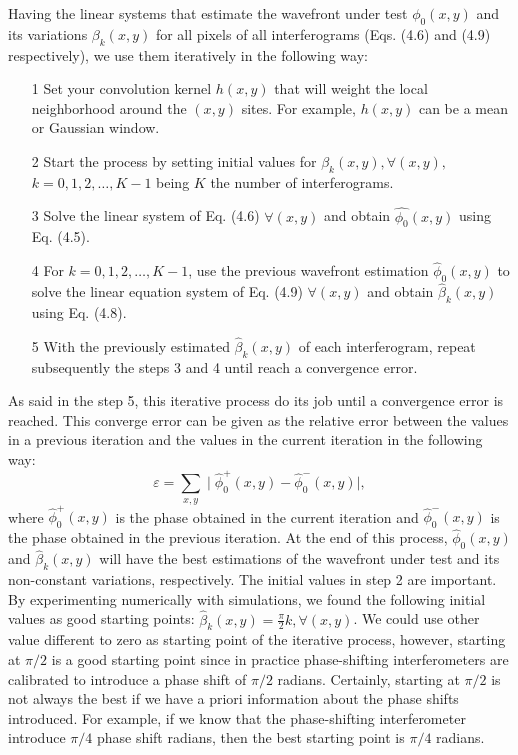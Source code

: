 Having the linear systems that estimate the wavefront under test $\phi_0(x,y)$
and its variations $\beta_k(x,y)$ for all pixels of all interferograms (Eqs.
(4.6) and (4.9) respectively), we use them iteratively in the following way:

\begin{itemize}
 \item[1] Set your convolution kernel $h(x,y)$ that will weight the local
 neighborhood around the $(x,y)$ sites. For example, $h(x,y)$ can be a mean or
 Gaussian window.
 \item[2] Start the process by setting initial values for $\beta_k(x,y),
 \forall (x,y),$ $k = 0,1,2,\dots,K-1$ being $K$ the number of interferograms.
 \item[3] Solve the linear system of Eq. (4.6) $\forall(x,y)$ and obtain 
 $\hat{\phi_0} (x,y)$ using Eq. (4.5).
 \item[4] For $k = 0,1,2,\dots,K-1$, use the previous wavefront estimation
 $\hat{\phi}_0 (x,y)$ to solve the linear equation system of Eq. (4.9)
 $\forall(x,y)$ and obtain $\hat{\beta}_k(x,y)$ using Eq. (4.8).
 \item[5] With the previously estimated $\hat{\beta}_k(x,y)$ of each
 interferogram, repeat subsequently the steps 3 and 4 until reach a convergence
 error.
\end{itemize}
As said in the step 5, this iterative process do its job until a convergence
error is reached. This converge error can be given as the relative error
between the values in a previous iteration and the values in the current
iteration in the following way:
\begin{equation}
 \varepsilon=\sum_{x,y}\mid\hat{\phi}_{0}^{+}(x,y)-\hat{\phi}_{0}^{-}(x,y)
 \mid,
\end{equation}
where $\hat{\phi}_{0}^{+}(x,y)$ is the phase obtained in the current iteration
and $\hat{\phi}_{0}^{-}(x,y)$ is the phase obtained in the previous iteration.
At the end of this process, $\hat{\phi}_{0}(x,y)$ and $\hat{\beta}_k(x,y)$
will have the best estimations of the wavefront under test and its non-constant
variations, respectively. The initial values in step 2 are important. By
experimenting numerically with simulations, we found the following initial
values as good starting points: $\hat{\beta}_k(x,y) = \frac{\pi}{2}k, 
\forall(x,y)$. We could use other value different to zero as starting point of
the iterative process, however, starting at $\pi/2$ is a good starting point
since in practice phase-shifting interferometers are calibrated to introduce
a phase shift of $\pi/2$ radians. Certainly, starting at $\pi/2$ is not always
the best if we have a priori information about the phase shifts introduced. For
example, if we know that the phase-shifting interferometer introduce $\pi/4$
phase shift radians, then the best starting point is $\pi/4$ radians.

